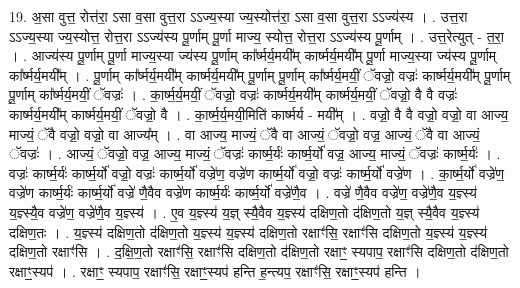\documentclass[17pt]{extarticle}
\begin{document}
19. अ॒सा वुत्त॒ रोत्त॑रा॒ ऽसा व॒सा वुत्त॒रा ऽऽज्य॒स्या ज्य॒स्योत्त॑रा॒ ऽसा व॒सा वुत्त॒रा ऽऽज्य॑स्य । . उत्त॒रा ऽऽज्य॒स्या ज्य॒स्योत्त॒ रोत्त॒रा ऽऽज्य॑स्य पू॒र्णाम् पू॒र्णा माज्य॒ स्योत्त॒ रोत्त॒रा ऽऽज्य॑स्य पू॒र्णाम् । . उत्त॒रेत्युत् - त॒रा॒ । . आज्य॑स्य पू॒र्णाम् पू॒र्णा माज्य॒स्या ज्य॑स्य पू॒र्णाम् का᳚र्ष्मर्य॒मयी᳚म् कार्ष्मर्य॒मयी᳚म् पू॒र्णा माज्य॒स्या ज्य॑स्य पू॒र्णाम् का᳚र्ष्मर्य॒मयी᳚म् । . पू॒र्णाम् का᳚र्ष्मर्य॒मयी᳚म् कार्ष्मर्य॒मयी᳚म् पू॒र्णाम् पू॒र्णाम् का᳚र्ष्मर्य॒मयीं॒ ॅवज्रो॒ वज्रः॑ कार्ष्मर्य॒मयी᳚म् पू॒र्णाम् पू॒र्णाम् का᳚र्ष्मर्य॒मयीं॒ ॅवज्रः॑ । . का॒र्ष्म॒र्य॒मयीं॒ ॅवज्रो॒ वज्रः॑ कार्ष्मर्य॒मयी᳚म् कार्ष्मर्य॒मयीं॒ ॅवज्रो॒ वै वै वज्रः॑ कार्ष्मर्य॒मयी᳚म् कार्ष्मर्य॒मयीं॒ ॅवज्रो॒ वै । . का॒र्ष्म॒र्य॒मयी॒मिति॑ कार्ष्मर्य - मयी᳚म् । . वज्रो॒ वै वै वज्रो॒ वज्रो॒ वा आज्य॒ माज्यं॒ ॅवै वज्रो॒ वज्रो॒ वा आज्य᳚म् । . वा आज्य॒ माज्यं॒ ॅवै वा आज्यं॒ ॅवज्रो॒ वज्र॒ आज्यं॒ ॅवै वा आज्यं॒ ॅवज्रः॑ । . आज्यं॒ ॅवज्रो॒ वज्र॒ आज्य॒ माज्यं॒ ॅवज्रः॑ कार्ष्म॒र्यः॑ कार्ष्म॒र्यो॑ वज्र॒ आज्य॒ माज्यं॒ ॅवज्रः॑ कार्ष्म॒र्यः॑ । . वज्रः॑ कार्ष्म॒र्यः॑ कार्ष्म॒र्यो॑ वज्रो॒ वज्रः॑ कार्ष्म॒र्यो॑ वज्रे॑ण॒ वज्रे॑ण कार्ष्म॒र्यो॑ वज्रो॒ वज्रः॑ कार्ष्म॒र्यो॑ वज्रे॑ण । . का॒र्ष्म॒र्यो॑ वज्रे॑ण॒ वज्रे॑ण कार्ष्म॒र्यः॑ कार्ष्म॒र्यो॑ वज्रे॑ णै॒वैव वज्रे॑ण कार्ष्म॒र्यः॑ कार्ष्म॒र्यो॑ वज्रे॑णै॒व । . वज्रे॑ णै॒वैव वज्रे॑ण॒ वज्रे॑णै॒व य॒ज्ञ्स्य॑ य॒ज्ञ्स्यै॒व वज्रे॑ण॒ वज्रे॑णै॒व य॒ज्ञ्स्य॑ । . ए॒व य॒ज्ञ्स्य॑ य॒ज्ञ् स्यै॒वैव य॒ज्ञ्स्य॑ दक्षिण॒तो द॑क्षिण॒तो य॒ज्ञ् स्यै॒वैव य॒ज्ञ्स्य॑ दक्षिण॒तः । . य॒ज्ञ्स्य॑ दक्षिण॒तो द॑क्षिण॒तो य॒ज्ञ्स्य॑ य॒ज्ञ्स्य॑ दक्षिण॒तो रक्षाꣳ॑सि॒ रक्षाꣳ॑सि दक्षिण॒तो य॒ज्ञ्स्य॑ य॒ज्ञ्स्य॑ दक्षिण॒तो रक्षाꣳ॑सि । . द॒क्षि॒ण॒तो रक्षाꣳ॑सि॒ रक्षाꣳ॑सि दक्षिण॒तो द॑क्षिण॒तो रक्षाꣳ॒॒ स्यपाप॒ रक्षाꣳ॑सि दक्षिण॒तो द॑क्षिण॒तो रक्षाꣳ॒॒स्यप॑ । . रक्षाꣳ॒॒ स्यपाप॒ रक्षाꣳ॑सि॒ रक्षाꣳ॒॒स्यप॑ हन्ति ह॒न्त्यप॒ रक्षाꣳ॑सि॒ रक्षाꣳ॒॒स्यप॑ हन्ति । \newline
\end{document}
